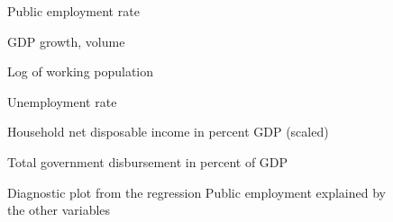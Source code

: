 \documentclass[a4paper, 10pt]{article}
\newcommand{\insertplot}[2]{
  \begin{figure}[!ht]
    \centering
    
    \caption{#2}
  \end{figure}
}
\begin{document}
%     
\begin{landscape}
  \insertplot{simple_model_egr.tex}{Public employment rate}
  \insertplot{simple_model_gdpv_annpct.tex}{GDP growth, volume}
  \insertplot{simple_model_lpop.tex}{Log of working population}
  \insertplot{simple_model_unr.tex}{Unemployment rate}
  \insertplot{simple_model_ydrh_to_gdpv.tex}{Household net disposable income in percent
    GDP (scaled)}
  \insertplot{simple_model_ypgtq.tex}{Total government disbursement in
    percent of GDP}
  \insertplot{model_diagnostic.tex}{Diagnostic plot from the regression
    Public employment explained by the other variables}
\end{landscape}
\end{document}
